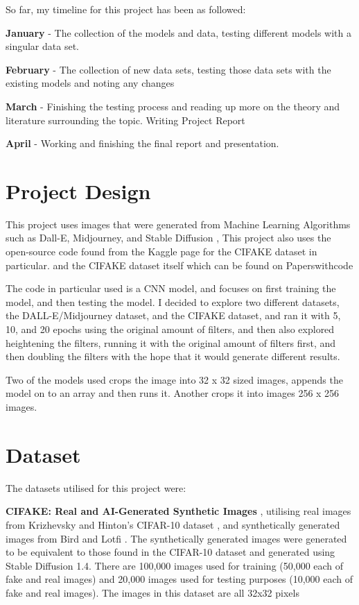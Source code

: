 \documentclass[12pt,letter]{article}
\begin{document}
So far, my timeline for this project has been as followed:

\textbf{January} - The collection of the models and data, testing different models with a singular data set.

\textbf{February} - The collection of new data sets, testing those data sets with the existing models and noting any changes

\textbf{March} - Finishing the testing process and reading up more on the theory and literature surrounding the topic. Writing Project Report

\textbf{April} - Working and finishing the final report and presentation. 

\section{Project Design}

This project uses images that were generated from Machine Learning Algorithms such as Dall-E, Midjourney, \cite{unknown2024} and Stable Diffusion \cite{birdj2023}, This project also uses the open-source code found from the Kaggle page for the CIFAKE dataset in particular. \cite{kaggle} and the CIFAKE dataset itself \cite{birdj2023}\cite{krizhevskya2009}\cite{kaggle} which can be found on Paperswithcode \cite{paperswithcode}

The code in particular used is a CNN model, and focuses on first training the model, and then testing the model. I decided to explore two different datasets, the DALL-E/Midjourney dataset, and the CIFAKE dataset, and ran it with 5, 10, and 20 epochs using the original amount of filters, and then also explored heightening the filters, running it with the original amount of filters first, and then doubling the filters with the hope that it would generate different results.

Two of the models used crops the image into 32 x 32 sized images, appends the model on to an array and then runs it. Another crops it into images 256 x 256 images.

\section{Dataset}

The datasets utilised for this project were: 

\textbf{CIFAKE: Real and AI-Generated Synthetic Images} \cite{paperswithcode}, utilising real images from Krizhevsky and Hinton's CIFAR-10 dataset \cite{krizhevskya2009}, and synthetically generated images from Bird and Lotfi \cite{birdj2023}. The synthetically generated images were generated to be equivalent to those found in the CIFAR-10 dataset and generated using Stable Diffusion 1.4. There are 100,000 images used for training (50,000 each of fake and real images) and 20,000 images used for testing purposes (10,000 each of fake and real images). The images in this dataset are all 32x32 pixels
\end{document}

